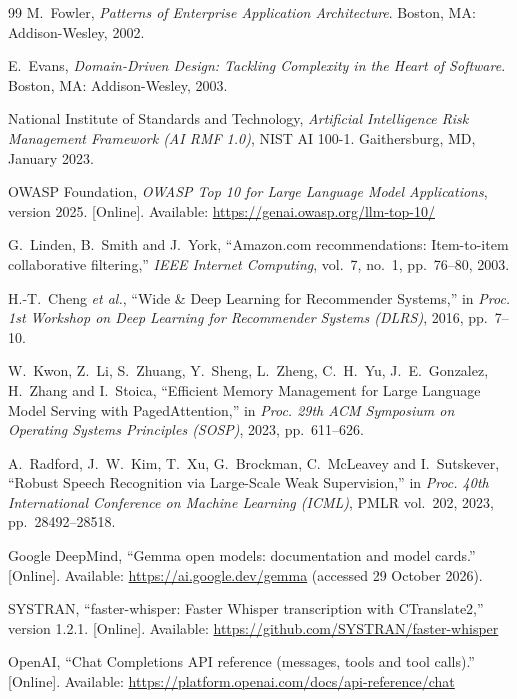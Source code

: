 \begin{thebibliography}{99}
 M.~Fowler, \emph{Patterns of Enterprise Application Architecture}. Boston, MA: Addison-Wesley,
2002.

 E.~Evans, \emph{Domain-Driven Design: Tackling Complexity in the Heart of Software}. Boston, MA:
Addison-Wesley, 2003.

 National Institute of Standards and Technology, \emph{Artificial Intelligence Risk Management
Framework (AI RMF 1.0)}, NIST AI 100-1. Gaithersburg, MD, January 2023.

 OWASP Foundation, \emph{OWASP Top 10 for Large Language Model Applications}, version 2025.
[Online]. Available: \url{https://genai.owasp.org/llm-top-10/}

 G.~Linden, B.~Smith and J.~York, ``Amazon.com recommendations: Item-to-item collaborative
filtering,'' \emph{IEEE Internet Computing}, vol.~7, no.~1, pp.~76--80, 2003.

 H.-T.~Cheng \emph{et al.}, ``Wide \& Deep Learning for Recommender Systems,'' in \emph{Proc. 1st
Workshop on Deep Learning for Recommender Systems (DLRS)}, 2016, pp.~7--10.

 W.~Kwon, Z.~Li, S.~Zhuang, Y.~Sheng, L.~Zheng, C.~H.~Yu, J.~E.~Gonzalez, H.~Zhang and I.~Stoica,
``Efficient Memory Management for Large Language Model Serving with PagedAttention,'' in \emph{Proc. 29th ACM
Symposium on Operating Systems Principles (SOSP)}, 2023, pp.~611--626.

 A.~Radford, J.~W.~Kim, T.~Xu, G.~Brockman, C.~McLeavey and I.~Sutskever, ``Robust Speech
Recognition via Large-Scale Weak Supervision,'' in \emph{Proc. 40th International Conference on Machine Learning
(ICML)}, PMLR vol.~202, 2023, pp.~28492--28518.

 Google DeepMind, ``Gemma open models: documentation and model cards.'' [Online]. Available:
\url{https://ai.google.dev/gemma} (accessed 29 October 2026).

 SYSTRAN, ``faster-whisper: Faster Whisper transcription with CTranslate2,'' version 1.2.1.
[Online]. Available: \url{https://github.com/SYSTRAN/faster-whisper}

 OpenAI, ``Chat Completions API reference (messages, tools and tool calls).'' [Online].
Available: \url{https://platform.openai.com/docs/api-reference/chat}


\end{thebibliography}
